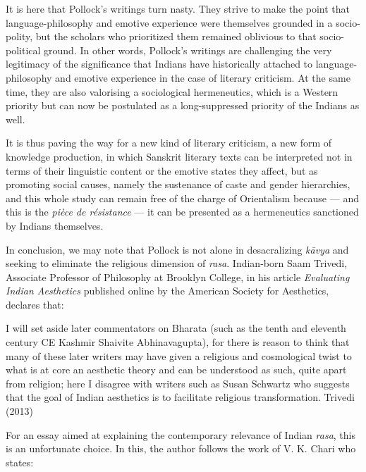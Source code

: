 It is here that Pollock's writings turn nasty. They strive to make the point that language-philosophy and emotive experience were themselves grounded in a socio-polity, but the scholars who prioritized them remained oblivious to that socio-political ground. In other words, Pollock's writings are challenging the very legitimacy of the significance that Indians have historically attached to language-philosophy and emotive experience in the case of literary criticism. At the same time, they are also valorising a sociological hermeneutics, which is a Western priority but can now be postulated as a long-suppressed priority of the Indians as well. 

It is thus paving the way for a new kind of literary criticism, a new form of knowledge production, in which Sanskrit literary texts can be interpreted not in terms of their linguistic content or the emotive states they affect, but as promoting social causes, namely the sustenance of caste and gender hierarchies, and this whole study can remain free of the charge of Orientalism because --- and this is the \textsl{pièce de résistance} --- it can be presented as a hermeneutics sanctioned by Indians themselves.

In conclusion, we may note that Pollock is not alone in desacralizing \textsl{kāvya} and seeking to eliminate the religious dimension of \textsl{rasa}. Indian-born Saam Trivedi, Associate Professor of Philosophy at Brooklyn College, in his article \textsl{Evaluating Indian Aesthetics} published online by the American Society for Aesthetics, declares that:

\begin{myquote}
I will set aside later commentators on Bharata (such as the tenth and eleventh century CE Kashmir Shaivite Abhinavagupta), for there is reason to think that many of these later writers may have given a religious and cosmological twist to what is at core an aesthetic theory and can be understood as such, quite apart from religion; here I disagree with writers such as Susan Schwartz who suggests that the goal of Indian aesthetics is to facilitate religious transformation. 
\hfill Trivedi (2013)
\end{myquote}

For an essay aimed at explaining the contemporary relevance of Indian \textsl{rasa}, this is an unfortunate choice. In this, the author follows the work of V. K. Chari who states:

